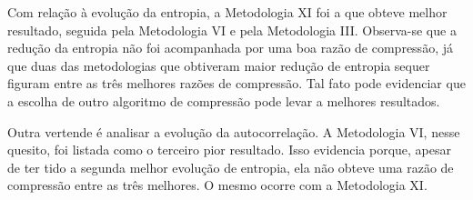 Com relação à evolução da entropia, a Metodologia XI foi a que obteve melhor
resultado, seguida pela Metodologia VI e pela Metodologia III. Observa-se que a redução da entropia não
foi acompanhada por uma boa razão de compressão, já que duas das metodologias
que obtiveram maior redução de entropia sequer figuram entre as três melhores
razões de compressão. Tal fato pode evidenciar que a escolha de outro algoritmo
de compressão pode levar a melhores resultados.

Outra vertende é analisar a evolução da autocorrelação. A Metodologia VI, nesse
quesito, foi listada como o terceiro pior resultado. Isso evidencia porque,
apesar de ter tido a segunda melhor evolução de entropia, ela não obteve uma
razão de compressão entre as três melhores. O mesmo ocorre com a Metodologia XI.